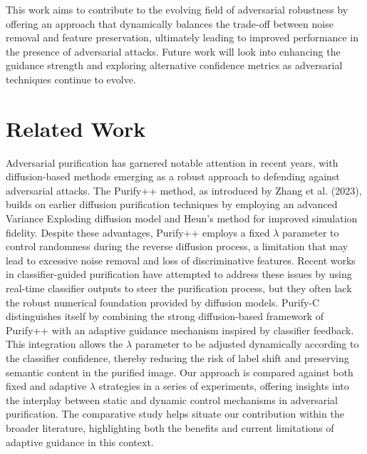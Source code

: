 \documentclass{article} %
\begin{document}
This work aims to contribute to the evolving field of adversarial robustness by offering an approach that dynamically balances the trade-off between noise removal and feature preservation, ultimately leading to improved performance in the presence of adversarial attacks. Future work will look into enhancing the guidance strength and exploring alternative confidence metrics as adversarial techniques continue to evolve.

\section{Related Work}
\label{sec:related}
Adversarial purification has garnered notable attention in recent years, with diffusion-based methods emerging as a robust approach to defending against adversarial attacks. The Purify++ method, as introduced by Zhang et al. (2023), builds on earlier diffusion purification techniques by employing an advanced Variance Exploding diffusion model and Heun's method\citep{Cuomo2022} for improved simulation fidelity. Despite these advantages, Purify++ employs a fixed $\lambda$ parameter to control randomness during the reverse diffusion process, a limitation that may lead to excessive noise removal and loss of discriminative features. Recent works in classifier-guided purification have attempted to address these issues by using real-time classifier outputs to steer the purification process, but they often lack the robust numerical foundation provided by diffusion models. Purify-C distinguishes itself by combining the strong diffusion-based framework of Purify++ with an adaptive guidance mechanism inspired by classifier feedback. This integration allows the $\lambda$ parameter to be adjusted dynamically according to the classifier confidence, thereby reducing the risk of label shift and preserving semantic content in the purified image. Our approach is compared against both fixed and adaptive $\lambda$ strategies in a series of experiments, offering insights into the interplay between static and dynamic control mechanisms in adversarial purification. The comparative study helps situate our contribution within the broader literature, highlighting both the benefits and current limitations of adaptive guidance in this context.
\end{document}
